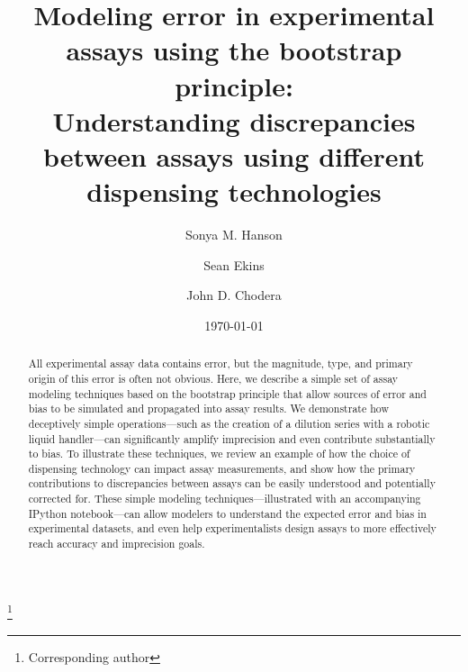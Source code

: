 \documentclass[aps,pre,twocolumn,nofootinbib,superscriptaddress,linenumbers]{revtex4-1}
\begin{document}
\title{Modeling error in experimental assays using the bootstrap principle:\\
Understanding discrepancies between assays using different dispensing technologies}

\author{Sonya M. Hanson}
\author{Sean Ekins}
\author{John D. Chodera}
 \thanks{Corresponding author}

\date{\today}

\begin{abstract}

All experimental assay data contains error, but the magnitude, type, and primary origin of this error is often not obvious.
Here, we describe a simple set of assay modeling techniques based on the bootstrap principle that allow sources of error and bias to be simulated and propagated into assay results.
We demonstrate how deceptively simple operations---such as the creation of a dilution series with a robotic liquid handler---can significantly amplify imprecision and even contribute substantially to bias.
To illustrate these techniques, we review an example of how the choice of dispensing technology can impact assay measurements, and show how the primary contributions to discrepancies between assays can be easily understood and potentially corrected for.
These simple modeling techniques---illustrated with an accompanying IPython notebook---can allow modelers to understand the expected error and bias in experimental datasets, and even help experimentalists design assays to more effectively reach accuracy and imprecision goals.
\end{abstract}

\maketitle
\end{document}
